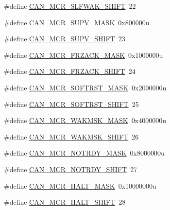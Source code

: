 \begin{DoxyCompactItemize}
\item 
\#define \hyperlink{group___c_a_n___register___masks_ga8dc0878396e4d4e4b73deec9cf23b0b1}{C\+A\+N\+\_\+\+M\+C\+R\+\_\+\+S\+L\+F\+W\+A\+K\+\_\+\+S\+H\+I\+FT}~22
\item 
\#define \hyperlink{group___c_a_n___register___masks_ga00521c6adbee738b0f73380052600203}{C\+A\+N\+\_\+\+M\+C\+R\+\_\+\+S\+U\+P\+V\+\_\+\+M\+A\+SK}~0x800000u
\item 
\#define \hyperlink{group___c_a_n___register___masks_ga5a448e496f0243c035ddcb70b8a07c4e}{C\+A\+N\+\_\+\+M\+C\+R\+\_\+\+S\+U\+P\+V\+\_\+\+S\+H\+I\+FT}~23
\item 
\#define \hyperlink{group___c_a_n___register___masks_gabec15eb427d7b249e72902c35bfc5f6e}{C\+A\+N\+\_\+\+M\+C\+R\+\_\+\+F\+R\+Z\+A\+C\+K\+\_\+\+M\+A\+SK}~0x1000000u
\item 
\#define \hyperlink{group___c_a_n___register___masks_ga666c7d11b911c7803d94b85ba54a05c3}{C\+A\+N\+\_\+\+M\+C\+R\+\_\+\+F\+R\+Z\+A\+C\+K\+\_\+\+S\+H\+I\+FT}~24
\item 
\#define \hyperlink{group___c_a_n___register___masks_gab9b1cfdb7014655d12f0a5ebafb3fc9b}{C\+A\+N\+\_\+\+M\+C\+R\+\_\+\+S\+O\+F\+T\+R\+S\+T\+\_\+\+M\+A\+SK}~0x2000000u
\item 
\#define \hyperlink{group___c_a_n___register___masks_gadff8b8b1d5645fca57a02109df3e507b}{C\+A\+N\+\_\+\+M\+C\+R\+\_\+\+S\+O\+F\+T\+R\+S\+T\+\_\+\+S\+H\+I\+FT}~25
\item 
\#define \hyperlink{group___c_a_n___register___masks_gac42f66e8828cd1923fee14d23ed99986}{C\+A\+N\+\_\+\+M\+C\+R\+\_\+\+W\+A\+K\+M\+S\+K\+\_\+\+M\+A\+SK}~0x4000000u
\item 
\#define \hyperlink{group___c_a_n___register___masks_gac10449abdadabddb4aef81457dfb7449}{C\+A\+N\+\_\+\+M\+C\+R\+\_\+\+W\+A\+K\+M\+S\+K\+\_\+\+S\+H\+I\+FT}~26
\item 
\#define \hyperlink{group___c_a_n___register___masks_ga013a34c0c5b808052d13ed4b9db2af75}{C\+A\+N\+\_\+\+M\+C\+R\+\_\+\+N\+O\+T\+R\+D\+Y\+\_\+\+M\+A\+SK}~0x8000000u
\item 
\#define \hyperlink{group___c_a_n___register___masks_ga90886e532a436fbd5b6e94e723acd148}{C\+A\+N\+\_\+\+M\+C\+R\+\_\+\+N\+O\+T\+R\+D\+Y\+\_\+\+S\+H\+I\+FT}~27
\item 
\#define \hyperlink{group___c_a_n___register___masks_gad5282ba01498ad05fa9ce4387050f1df}{C\+A\+N\+\_\+\+M\+C\+R\+\_\+\+H\+A\+L\+T\+\_\+\+M\+A\+SK}~0x10000000u
\item 
\#define \hyperlink{group___c_a_n___register___masks_gab976a082962ddeb0a7738bc5385b35da}{C\+A\+N\+\_\+\+M\+C\+R\+\_\+\+H\+A\+L\+T\+\_\+\+S\+H\+I\+FT}~28

\end{DoxyCompactItemize}
